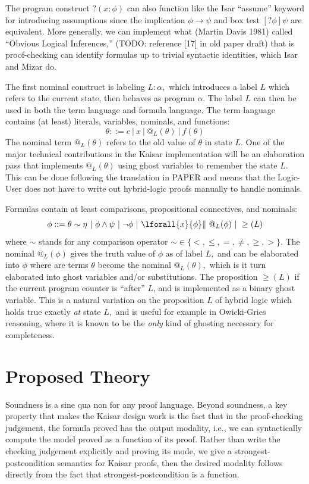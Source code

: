 \documentclass[12pt]{cmuthesis}
\theoremstyle{definition}
\theoremstyle{remark}
\begin{document}
The program construct $?(x:\phi)$ can also function like the Isar ``assume'' keyword for introducing assumptions since  the implication $\phi \rightarrow \psi$ and box test $[?\phi]\psi$ are equivalent.
More generally, we can implement what (Martin Davis 1981) called ``Obvious Logical Inferences,'' 
(TODO: reference [17] in old paper draft) that is proof-checking can identify formulas up to trivial syntactic identities, which Isar and Mizar do.

The first nominal construct is labeling $L: \alpha,$ which introduces a label $L$ which refers to the current state, then behaves as program $\alpha$.
The label $L$ can then be used in both the term language and formula language.
The term language contains (at least) literals, variables, nominals, and functions:
\[\theta ::= c\ |\ x\ |\ @_L(\theta)\ |\ f(\theta)\]
The nominal term $@_L(\theta)$ refers to the old value of $\theta$ in state $L$.
One of the major technical contributions in the Kaisar implementation will be an elaboration pass that implements $@_L(\theta)$ using ghost variables to remember the state $L$.
This can be done following the translation in PAPER and means that the Logic-User does not have to write out hybrid-logic proofs manually to handle nominals.

\newcommand{\eafter}[1]{\geq(#1)}
Formulas contain at least comparisons, propositional connectives, and nominals:
\[\phi ::=  \theta \sim \eta\ |\ \phi \land \psi\ |\ \neg \phi\ |\ \lforall{x}{\phi}\|\ @_L(\phi)\ |\ \eafter{L}\]
where $\sim$ stands for any comparison operator $\sim \in \{<,\leq,=,\neq,\geq,>\}$.
The nominal $@_L(\phi)$ gives the truth value of $\phi$ as of label $L,$ and can be elaborated into $\phi$ where are terms $\theta$ become the nominal $@_L(\theta),$ which is it turn elaborated into ghost variables and/or substitutions.
The proposition $\eafter{L}$ if the current program counter is ``after'' $L$, and is implemented as a binary ghost variable.
This is a natural variation on the proposition $L$ of hybrid logic which holds true exactly \emph{at} state $L,$ and is useful for example in Owicki-Gries reasoning, where it is known to be the \emph{only} kind of ghosting necessary for completeness. %


\section{Proposed Theory}
Soundness is a sine qua non for any proof language.
Beyond soundness, a key property that makes the Kaisar design work is the fact that in the proof-checking judgement, the formula proved has the output modality, i.e., we can syntactically compute the model proved as a function of its proof.
Rather than write the checking judgement explicitly and proving its mode, we give a strongest-postcondition semantics for Kaisar proofs, then the desired modality follows directly from the fact that strongest-postcondition is a function.
\end{document}
